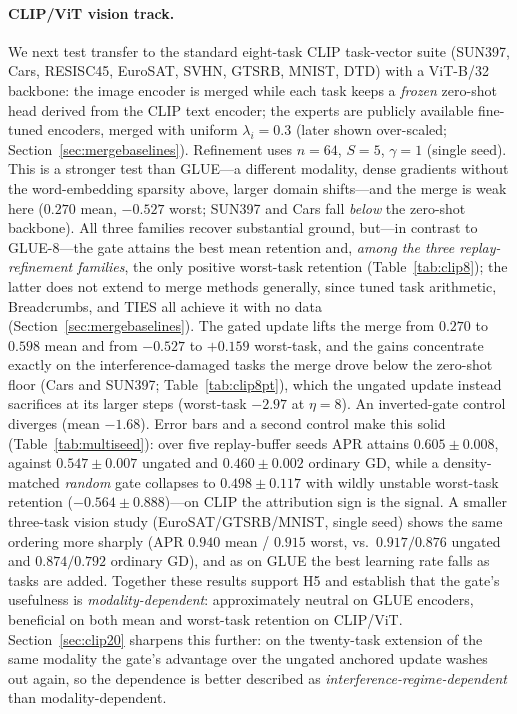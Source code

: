 \documentclass[11pt]{article}
\begin{document}
\paragraph{CLIP/ViT vision track.}
We next test transfer to the standard eight-task CLIP task-vector suite (SUN397, Cars, RESISC45, EuroSAT, SVHN, GTSRB, MNIST, DTD) with a ViT-B/32 backbone: the image encoder is merged while each task keeps a \emph{frozen} zero-shot head derived from the CLIP text encoder; the experts are publicly available fine-tuned encoders, merged with uniform $\lambda_i=0.3$ (later shown over-scaled; Section~\ref{sec:mergebaselines}). Refinement uses $n=64$, $S=5$, $\gamma=1$ (single seed). This is a stronger test than GLUE---a different modality, dense gradients without the word-embedding sparsity above, larger domain shifts---and the merge is weak here ($0.270$ mean, $-0.527$ worst; SUN397 and Cars fall \emph{below} the zero-shot backbone). All three families recover substantial ground, but---in contrast to GLUE-8---the gate attains the best mean retention and, \emph{among the three replay-refinement families}, the only positive worst-task retention (Table~\ref{tab:clip8}); the latter does not extend to merge methods generally, since tuned task arithmetic, Breadcrumbs, and TIES all achieve it with no data (Section~\ref{sec:mergebaselines}). The gated update lifts the merge from $0.270$ to $0.598$ mean and from $-0.527$ to $+0.159$ worst-task, and the gains concentrate exactly on the interference-damaged tasks the merge drove below the zero-shot floor (Cars and SUN397; Table~\ref{tab:clip8pt}), which the ungated update instead sacrifices at its larger steps (worst-task $-2.97$ at $\eta=8$). An inverted-gate control diverges (mean $-1.68$). Error bars and a second control make this solid (Table~\ref{tab:multiseed}): over five replay-buffer seeds APR attains $0.605\pm0.008$, against $0.547\pm0.007$ ungated and $0.460\pm0.002$ ordinary GD, while a density-matched \emph{random} gate collapses to $0.498\pm0.117$ with wildly unstable worst-task retention ($-0.564\pm0.888$)---on CLIP the attribution sign is the signal. A smaller three-task vision study (EuroSAT/GTSRB/MNIST, single seed) shows the same ordering more sharply (APR $0.940$ mean / $0.915$ worst, vs.\ $0.917/0.876$ ungated and $0.874/0.792$ ordinary GD), and as on GLUE the best learning rate falls as tasks are added. Together these results support H5 and establish that the gate's usefulness is \emph{modality-dependent}: approximately neutral on GLUE encoders, beneficial on both mean and worst-task retention on CLIP/ViT. Section~\ref{sec:clip20} sharpens this further: on the twenty-task extension of the same modality the gate's advantage over the ungated anchored update washes out again, so the dependence is better described as \emph{interference-regime-dependent} than modality-dependent.
\end{document}
